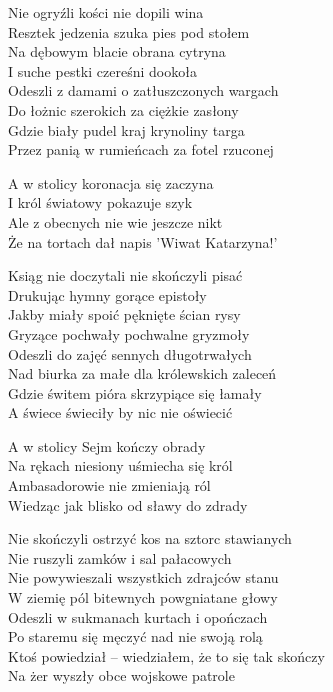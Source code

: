 \begin{text}
    Nie ogryźli kości nie dopili wina\\
    Resztek jedzenia szuka pies pod stołem\\
    Na dębowym blacie obrana cytryna\\
    I suche pestki czereśni dookoła\\
    Odeszli z damami o zatłuszczonych wargach\\
    Do łożnic szerokich za ciężkie zasłony\\
    Gdzie biały pudel kraj krynoliny targa\\
    Przez panią w rumieńcach za fotel rzuconej

    \vin A w stolicy koronacja się zaczyna\\
    \vin I król światowy pokazuje szyk\\
    \vin Ale z obecnych nie wie jeszcze nikt\\
    \vin Że na tortach dał napis 'Wiwat Katarzyna!'

    Ksiąg nie doczytali nie skończyli pisać\\
    Drukując hymny gorące epistoły\\
    Jakby miały spoić pęknięte ścian rysy\\
    Gryzące pochwały pochwalne gryzmoły\\
    Odeszli do zajęć sennych długotrwałych\\
    Nad biurka za małe dla królewskich zaleceń\\
    Gdzie świtem pióra skrzypiące się łamały\\
    A świece świeciły by nic nie oświecić

    \vin A w stolicy Sejm kończy obrady\\
    \vin Na rękach niesiony uśmiecha się król\\
    \vin Ambasadorowie nie zmieniają ról\\
    \vin Wiedząc jak blisko od sławy do zdrady

    Nie skończyli ostrzyć kos na sztorc stawianych\\
    Nie ruszyli zamków i sal pałacowych\\
    Nie powywieszali wszystkich zdrajców stanu\\
    W ziemię pól bitewnych powgniatane głowy\\
    Odeszli w sukmanach kurtach i opończach\\
    Po staremu się męczyć nad nie swoją rolą\\
    Ktoś powiedział – wiedziałem, że to się tak skończy\\
    Na żer wyszły obce wojskowe patrole


\end{text}
